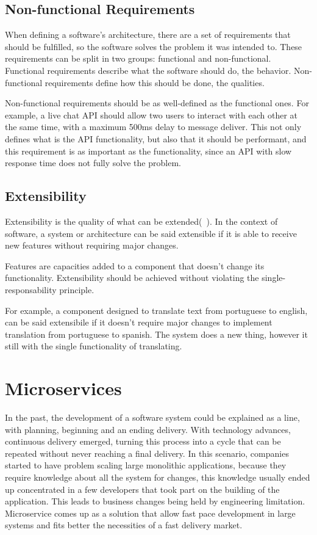 \subsection*{Non-functional Requirements}
\label{sec:nonfunctional}
When defining a software's architecture, there are a set of requirements that should be fulfilled, so the software solves the problem it was intended to. These requirements can be split in two groups: functional and non-functional. Functional requirements describe what the software should do, the behavior. Non-functional requirements define how this should be done, the qualities.

Non-functional requirements should be as well-defined as the functional ones. For example, a live chat API should allow two users to interact with each other at the same time, with a maximum 500ms delay to message deliver. This not only defines what is the API functionality, but also that it should be performant, and this requirement is as important as the functionality, since an API with slow response time does not fully solve the problem.

\subsection*{Extensibility}
\label{sec:extensibility}
Extensibility is the quality of what can be extended(~\cite{Evoluctionary}). In the context of software, a system or architecture can be said extensible if it is able to receive new features without requiring major changes. 

Features are capacities added to a component that doesn't change its functionality. Extensibility should be achieved without violating the single-responsability principle.

For example, a component designed to translate text from portuguese to english, can be said extensibile if it doesn't require major changes to implement translation from portuguese to spanish. The system does a new thing, however it still with the single functionality of translating.

\section{Microservices}
\label{sec:microservices}
In the past, the development of a software system could be explained as a line, with planning, beginning and an ending delivery. With technology advances, continuous delivery emerged, turning this process into a cycle that can be repeated without never reaching a final delivery. In this scenario, companies started to have problem scaling large monolithic applications, because they require knowledge about all the system for changes, this knowledge usually ended up concentrated in a few developers that took part on the building of the application. This leads to business changes being held by engineering limitation. Microservice comes up as a solution that allow fast pace development in large systems and fits better the necessities of a fast delivery market. 

